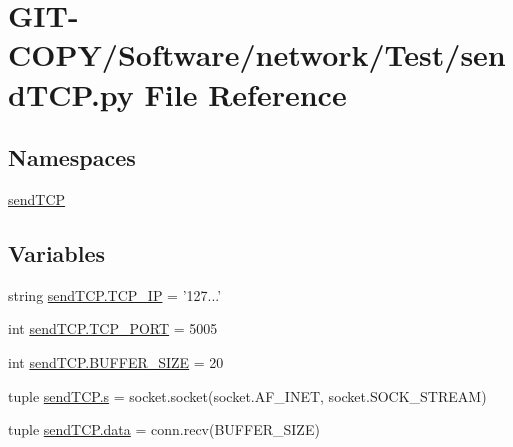 \hypertarget{GIT-COPY_2Software_2network_2Test_2sendTCP_8py}{}\section{G\+I\+T-\/\+C\+O\+P\+Y/\+Software/network/\+Test/send\+T\+C\+P.py File Reference}
\label{GIT-COPY_2Software_2network_2Test_2sendTCP_8py}
\subsection*{Namespaces}
\begin{DoxyCompactItemize}
\item 
 \hyperlink{namespacesendTCP}{send\+T\+C\+P}
\end{DoxyCompactItemize}
\subsection*{Variables}
\begin{DoxyCompactItemize}
\item 
string \hyperlink{namespacesendTCP_a05a250bce739d0837d68cf4ee2493081}{send\+T\+C\+P.\+T\+C\+P\+\_\+\+I\+P} = '127...'
\item 
int \hyperlink{namespacesendTCP_a2fb17394c40ece35f8159663669141ab}{send\+T\+C\+P.\+T\+C\+P\+\_\+\+P\+O\+R\+T} = 5005
\item 
int \hyperlink{namespacesendTCP_aae5278c61bd69966fd39810dd25d66a7}{send\+T\+C\+P.\+B\+U\+F\+F\+E\+R\+\_\+\+S\+I\+Z\+E} = 20
\item 
tuple \hyperlink{namespacesendTCP_a5755bd39fa2a044b677c3f2503d4ab21}{send\+T\+C\+P.\+s} = socket.\+socket(socket.\+A\+F\+\_\+\+I\+N\+E\+T, socket.\+S\+O\+C\+K\+\_\+\+S\+T\+R\+E\+A\+M)
\item 
tuple \hyperlink{namespacesendTCP_aab2480871ae151270c83e7ac757b1bcb}{send\+T\+C\+P.\+data} = conn.\+recv(B\+U\+F\+F\+E\+R\+\_\+\+S\+I\+Z\+E)
\end{DoxyCompactItemize}
